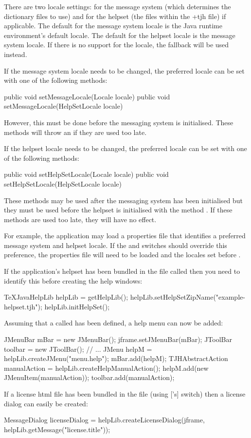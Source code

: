 \documentclass[toc=listof]{scrreport}
\newcommand\TJHZHswitch[1]{\switch{tjhziphelpset.#1}}
\begin{document}
There are two locale settings: for the message system (which
determines the dictionary files to use) and for the helpset (the
files within the \ext+{tjh} file) if applicable. The default for the
message system locale is the Java runtime environment's default
locale.  The default for the helpset locale is the message system
locale.  If there is no support for the locale, the fallback will be
used instead.

If the message system locale needs to be changed, the preferred
locale can be set with one of the following  methods:
\begin{codebox}
public void setMessageLocale(Locale locale)
public void setMessageLocale(HelpSetLocale locale)
\end{codebox}
However, this must be done before the messaging system is initialised.
These methods will throw an  if
they are used too late.

If the helpset locale needs to be changed, the preferred locale can
be set with one of the following  methods:
\begin{codebox}
public void setHelpSetLocale(Locale locale)
public void setHelpSetLocale(HelpSetLocale locale)
\end{codebox}
These methods may be used after the messaging system has been
initialised but they must be used before the helpset is initialised
with the  method . If these
methods are used too late, they will have no effect.

For example, the application may load a properties file that
identifies a preferred message system and helpset locale.
If the  and  switches should override
this preference, the properties file will need to be loaded 
and the locales set before .

If the application's helpset has been bundled in the file called
 then you need to identify this before
creating the help windows:
\begin{codebox}
TeXJavaHelpLib helpLib = getHelpLib();
helpLib.setHelpSetZipName("example-helpset.tjh");
helpLib.initHelpSet();
\end{codebox}
Assuming that a  called  has been defined,
a help menu can now be added:
\begin{codebox}
JMenuBar mBar = new JMenuBar();
jframe.setJMenuBar(mBar);
JToolBar toolbar = new JToolBar();
// ...
JMenu helpM = helpLib.createJMenu("menu.help");
mBar.add(helpM);
\codepar
TJHAbstractAction manualAction = helpLib.createHelpManualAction();
helpM.add(new JMenuItem(manualAction));
toolbar.add(manualAction);
\end{codebox}
If a license \gls{html} file has been bundled in the 
file (using ['s] \TJHZHswitch{license-file} switch)
then a license dialog can easily be created:
\begin{codebox}
MessageDialog licenseDialog = helpLib.createLicenseDialog(jframe,
  helpLib.getMessage("license.title"));
\end{codebox}
\end{document}
